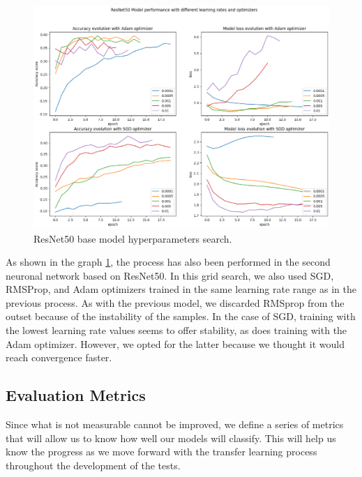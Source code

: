 \begin{figure}[ht]
    \begin{center}
        \includegraphics[scale=0.9]{images/Building/Hyperparameters/RestNet50_Model performance hyperparameters search.png}
        \caption{ResNet50 base model hyperparameters search.}
    \label{fig: ResNet50_hyperparameters}    
    \end{center}
\end{figure}

As shown in the graph \ref{fig: ResNet50_hyperparameters}, the process has also been performed in the second neuronal network based on ResNet50. In this grid search, we also used SGD, RMSProp, and Adam optimizers trained in the same learning rate range as in the previous process. As with the previous model, we discarded RMSprop from the outset because of the instability of the samples. In the case of SGD, training with the lowest learning rate values seems to offer stability, as does training with the Adam optimizer. However, we opted for the latter because we thought it would reach convergence faster. 

\newpage
\subsection{Evaluation Metrics}

Since what is not measurable cannot be improved, we define a series of metrics that will allow us to know how well our models will classify. This will help us know the progress as we move forward with the transfer learning process throughout the development of the tests. 

